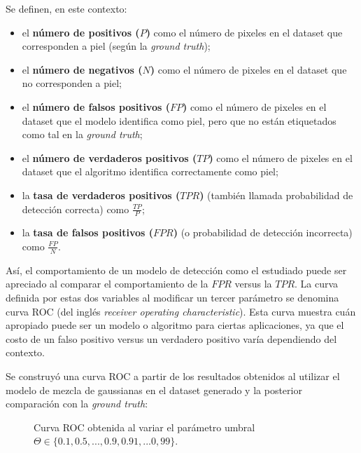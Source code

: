 \documentclass[12pt]{article}
\begin{document}
Se definen, en este contexto: 

\begin{itemize}
    \item el \textbf{número de positivos ($P$)} como el número de pixeles en el dataset
        que corresponden a piel (según la \emph{ground truth});
    \item el \textbf{número de negativos ($N$)} como el número de pixeles en el dataset
        que no corresponden a piel;
    \item el \textbf{número de falsos positivos ($FP$)} como el número de
        pixeles en el dataset que el modelo identifica como piel, pero que no
        están etiquetados como tal en la \emph{ground truth};
    \item el \textbf{número de verdaderos positivos ($TP$)} como el número de
        pixeles en el dataset que el algoritmo identifica correctamente como
        piel;
    \item la \textbf{tasa de verdaderos positivos ($TPR$)} (también llamada
        probabilidad de detección correcta) como $\frac{TP}{P}$;
    \item la \textbf{tasa de falsos positivos ($FPR$)} (o probabilidad de
        detección incorrecta) como $\frac{FP}{N}$.
\end{itemize}

Así, el comportamiento de un modelo de detección como el estudiado puede ser
apreciado al comparar el comportamiento de la $FPR$ versus la $TPR$. La curva
definida por estas dos variables al modificar un tercer parámetro se denomina curva
ROC (del inglés \emph{receiver operating characteristic}). Esta curva muestra
cuán apropiado puede ser un modelo o algoritmo para ciertas aplicaciones, ya que
el costo de un falso positivo versus un verdadero positivo varía dependiendo del
contexto.

Se construyó una curva ROC a partir de los resultados obtenidos al utilizar el modelo de mezcla
de gaussianas en el dataset generado y la posterior comparación con la
\emph{ground truth}:


\begin{figure}[h]
    \centering

    \caption{Curva ROC obtenida al variar el parámetro umbral $\Theta \in \{ 0.1,0.5,...,0.9,0.91,...0,99\}$.}
\end{figure}
\end{document}
